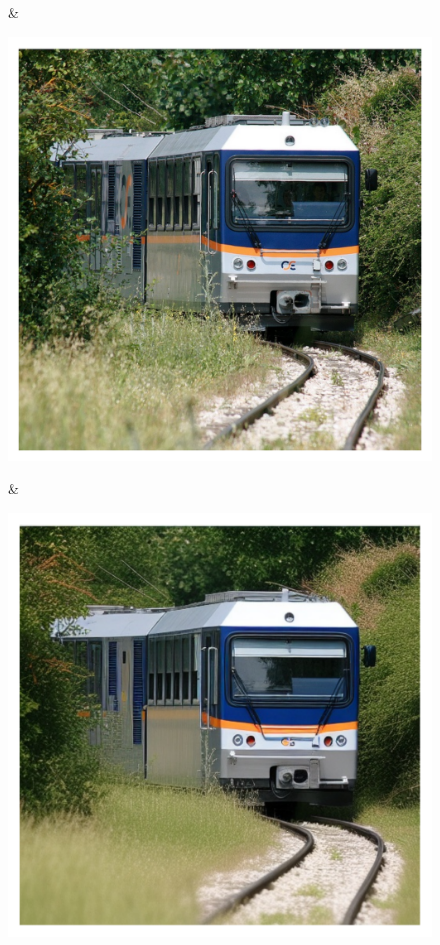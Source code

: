 \documentclass[letterpaper]{article} %
\begin{document}
\begin{figure}
\begin{tabular}
\begin{minipage}{\linewidth}
    \end{minipage} &
    \begin{minipage}{\linewidth}
        \includegraphics[width=\linewidth]{original_compare/20.pdf}
    \end{minipage} &
    \begin{minipage}{\linewidth}
        \includegraphics[width=\linewidth]{Ours_compare/20.pdf}

\end{minipage}
\end{tabular}
\end{figure}
\end{document}
